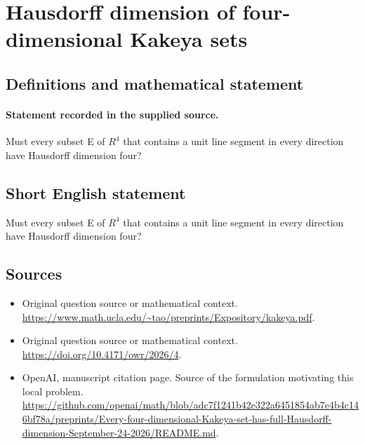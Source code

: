 \documentclass[11pt]{article}
\begin{document}
\section*{Hausdorff dimension of four-dimensional Kakeya sets}\label{statement}
\subsection{Definitions and mathematical statement}
\paragraph{Statement recorded in the supplied source.}
Must every subset E of $R^4$ that contains a unit line segment in every direction have Hausdorff dimension four?
\subsection{Short English statement}
Must every subset E of $R^4$ that contains a unit line segment in every direction have Hausdorff dimension four?
\subsection{Sources}
\begin{itemize}
\item[S1] Original question source or mathematical context.
\url{https://www.math.ucla.edu/~tao/preprints/Expository/kakeya.pdf}.
\item[S2] Original question source or mathematical context.
\url{https://doi.org/10.4171/owr/2026/4}.
\item[S3] OpenAI, manuscript citation page. Source of the formulation motivating this local problem.
\url{https://github.com/openai/math/blob/adc7f1241b42e322a6451854ab7e4b4c146bf78a/preprints/Every-four-dimensional-Kakeya-set-has-full-Hausdorff-dimension-September-24-2026/README.md}.
\end{itemize}
\end{document}
